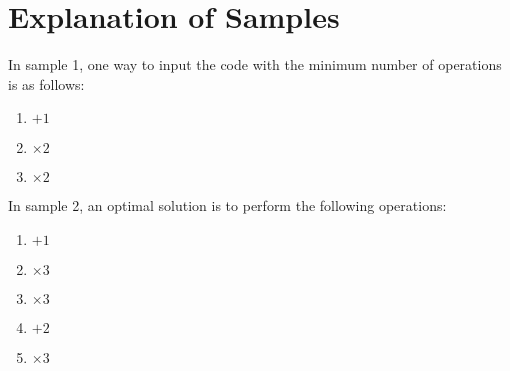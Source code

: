 \section*{Explanation of Samples}
In sample 1, one way to input the code with the minimum number of operations is as follows:
\begin{enumerate}
  \item $+1$
  \item $\times 2$
  \item $\times 2$
\end{enumerate}


In sample 2, an optimal solution is to perform the following operations:
\begin{enumerate}
  \item $+1$
  \item $\times 3$
  \item $\times 3$
  \item $+2$
  \item $\times 3$
\end{enumerate}
